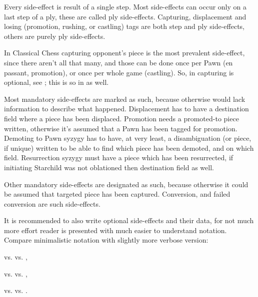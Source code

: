Every side-effect is result of a single step. Most side-effects can occur only on
a last step of a ply, these are called ply side-effects. Capturing, displacement
and losing (promotion, rushing, or castling) tags are both step and ply side-effects,
others are purely ply side-effects.

In Classical Chess capturing opponent's piece is the most prevalent side-effect,
since there aren't all that many, and those can be done once per Pawn (en passant,
promotion), or once per whole game (castling). So, in  capturing is
optional, see ; this is so in  as well.

Most mandatory side-effects are marked as such, because otherwise 
would lack information to describe what happened. Displacement has to have a
destination field where a piece has been displaced. Promotion needs a promoted-to
piece written, otherwise it's assumed that a Pawn has been tagged for promotion.
Demoting to Pawn syzygy has to have, at very least, a disambiguation (or piece,
if unique) written to be able to find which piece has been demoted, and on which
field. Resurrection syzygy must have a piece which has been resurrected, if
initiating Starchild was not oblationed then destination field as well.

Other mandatory side-effects are designated as such, because otherwise it could
be assumed that targeted piece has been captured. Conversion, and failed conversion
are such side-effects.

It is recommended to also write optional side-effects and their data, for not much
more effort reader is presented with much easier to understand notation. Compare
minimalistic notation with slightly more verbose version:

\noindent
{} vs. \newline
{} vs. \newline
{},

\noindent
{} vs. \newline
{} vs. \newline
{},

\noindent
{} vs. \newline
{} vs. \newline
{}.

